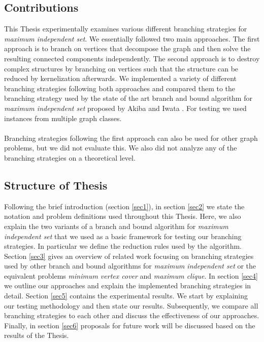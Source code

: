 \documentclass[]{article}
\begin{document}
\subsection{Contributions}

This Thesis experimentally examines various different branching strategies for \textit{maximum independent set}. We essentially followed two main approaches. The first approach is to branch on vertices that decompose the graph and then solve the resulting connected components independently. The second approach is to destroy complex structures by branching on vertices such that the structure can be reduced by kernelization afterwards. We implemented a variety of different branching strategies following both approaches and compared them to the branching strategy used by the state of the art branch and bound algorithm for \textit{maximum independent set} proposed by Akiba and Iwata \cite{AkibaIwata}. For testing we used instances from multiple graph classes.\\\\
Branching strategies following the first approach can also be used for other graph problems, but we did not evaluate this. We also did not analyze any of the branching strategies on a theoretical level.  



\subsection{Structure of Thesis}

Following the brief introduction (section \ref{sec1}), in section \ref{sec2} we state the notation and problem definitions used throughout this Thesis. Here, we also explain the two variants of a branch and bound algorithm for \textit{maximum independent set} that we used as a basic framework for testing our branching strategies. In particular we define the reduction rules used by the algorithm.\\
Section \ref{sec3} gives an overview of related work focusing on branching strategies used by other branch and bound algorithms for \textit{maximum independent set} or the equivalent problems \textit{minimum vertex cover} and \textit{maximum clique}.
In section \ref{sec4} we outline our approaches and explain the implemented branching strategies in detail. Section \ref{sec5} contains the experimental results. We start by explaining our testing methodology and then state our results. Subsequently, we compare all branching strategies to each other and discuss the effectiveness of our approaches. Finally, in section \ref{sec6} proposals for future work will be discussed based on the results of the Thesis.
\end{document}
